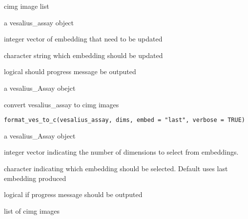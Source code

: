 \documentclass[a4paper]{book}
\begin{document}
%
\begin{Arguments}
\begin{ldescription}
\item[\code{cimg}] cimg image list

\item[\code{vesalius\_assay}] a vesalius\_assay object

\item[\code{dims}] integer vector of embedding that need to be updated

\item[\code{embed}] character string which embedding should be updated

\item[\code{verbose}] logical should progress message be outputed
\end{ldescription}
\end{Arguments}
%
\begin{Value}
a vesalius\_Assay obejct
\end{Value}
%
\begin{Description}
convert vesalius\_assay to cimg images
\end{Description}
%
\begin{Usage}
\begin{verbatim}
format_ves_to_c(vesalius_assay, dims, embed = "last", verbose = TRUE)
\end{verbatim}
\end{Usage}
%
\begin{Arguments}
\begin{ldescription}
\item[\code{vesalius\_assay}] a vesalius\_Assay object

\item[\code{dims}] integer vector indicating the number of dimensions to select from
embeddings.

\item[\code{embed}] character indicating which embedding should be selected.
Default uses last embedding produced

\item[\code{verbose}] logical if progress message should be outputed
\end{ldescription}
\end{Arguments}
%
\begin{Value}
list of cimg images
\end{Value}
\end{document}
